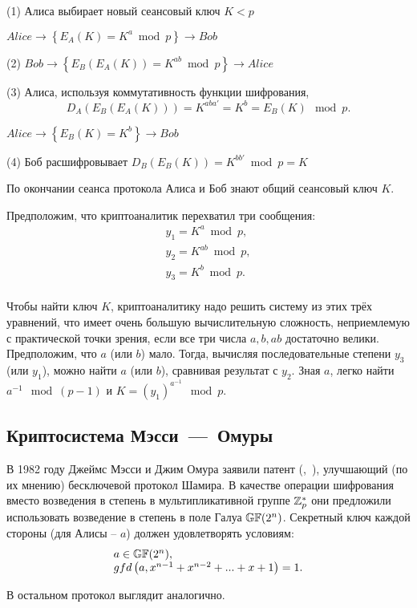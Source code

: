 \begin{protocol}
    \item[(1)] Алиса выбирает новый сеансовый ключ $K < p$
    \item[{}] $Alice \to \left\{ E_A \left( K \right) = K^a \bmod p \right\} \to Bob$
    \item[(2)] $Bob \to \left\{ E_B \left( E_A \left( K \right) \right) = K^{ab} \bmod p \right\} \to Alice$
    \item[(3)] Алиса, используя коммутативность функции шифрования,
	\[ D_A \left( E_B \left( E_A \left( K \right) \right) \right) = K^{aba'} = K^b = E_B \left( K \right) \mod p. \]
    \item[{}] $Alice \to \left\{ E_B \left( K \right) = K^b \right\} \to Bob$
    \item[(4)] Боб расшифровывает $D_B \left( E_B \left( K \right) \right) = K^{bb'} \bmod p = K$
\end{protocol}

По окончании сеанса протокола Алиса и Боб знают общий сеансовый ключ $K$.

Предположим, что криптоаналитик перехватил три сообщения:
\[ \begin{array}{l}
    y_1 = K^a \bmod p, \\
    y_2 = K^{ab} \bmod p, \\
    y_3 = K^b \bmod p. \\
\end{array} \]

Чтобы найти ключ $K$, криптоаналитику надо решить систему из этих трёх уравнений, что имеет очень большую вычислительную сложность, неприемлемую с практической точки зрения, если все три числа $a, b, ab$ достаточно велики. Предположим, что $a$ (или $b$) мало. Тогда, вычисляя последовательные степени $y_3$ (или $y_1$), можно найти $a$ (или $b$), сравнивая результат с $y_2$. Зная $a$, легко найти $a^{-1}\mod(p-1)$ и $K=(y_1)^{a^{-1}}\mod p$.


\subsection{Криптосистема Мэсси~---~Омуры}

В 1982 году Джеймс Мэсси и Джим Омура заявили патент (,~\cite{Massey:Omura:1986}), улучшающий (по их мнению) бесключевой протокол Шамира. В качестве операции шифрования вместо возведения в степень в мультипликативной группе $\mathbb{Z}_p^*$ они предложили использовать возведение в степень в поле Галуа $\mathbb{GF}(2^n)$. Секретный ключ каждой стороны (для Алисы -- $a$) должен удовлетворять условиям:
\[ \begin{array}{l}
 a \in \mathbb{GF}(2^n), \\
 gfd \left( a, x^{ n-1 } + x^{ n-2 } + ... + x + 1 \right) = 1. \\
\end{array} \]

В остальном протокол выглядит аналогично.

